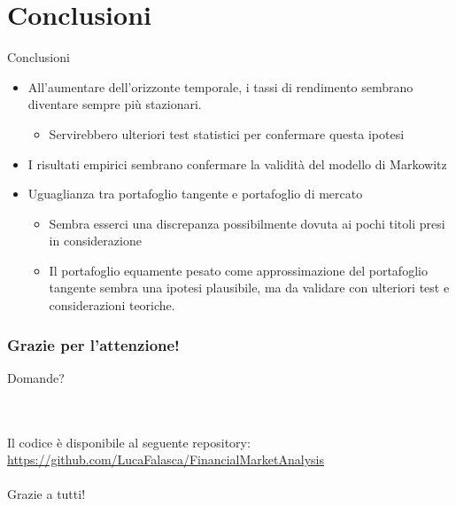 \documentclass[compress]{beamer}
\begin{document}
\section{Conclusioni}

\begin{frame}{Conclusioni}
	\begin{itemize}
		\item All'aumentare dell'orizzonte temporale, i tassi di rendimento sembrano diventare sempre più stazionari.
		\begin{itemize}
			\item Servirebbero ulteriori test statistici per confermare questa ipotesi
		\end{itemize}
		\item I risultati empirici sembrano confermare la validità del modello di Markowitz
		\item Uguaglianza tra portafoglio tangente e portafoglio di mercato
		\begin{itemize}
			\item Sembra esserci una discrepanza possibilmente dovuta ai pochi titoli presi in considerazione
			\item Il portafoglio equamente pesato come approssimazione del portafoglio tangente sembra una ipotesi plausibile, ma da validare con ulteriori test e considerazioni teoriche.
		\end{itemize}
	\end{itemize}	
\end{frame}
\begin{frame}
	\frametitle{Grazie per l'attenzione!}
	\begin{Huge}
		Domande?
	\end{Huge} 
	\\ \\
	Il codice è disponibile al seguente repository: \url{https://github.com/LucaFalasca/FinancialMarketAnalysis}
	\\ \\
	Grazie a tutti!
	
\end{frame}
\end{document}
